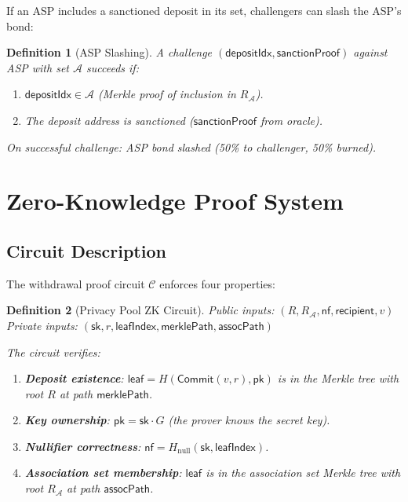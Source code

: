 \documentclass[11pt,a4paper]{article}
\newtheorem{definition}{Definition}
\begin{document}
If an ASP includes a sanctioned deposit in its set, challengers can slash the ASP's bond:

\begin{definition}[ASP Slashing]
A challenge $(\mathsf{depositIdx}, \mathsf{sanctionProof})$ against ASP with set $\mathcal{A}$ succeeds if:
\begin{enumerate}
    \item $\mathsf{depositIdx} \in \mathcal{A}$ (Merkle proof of inclusion in $R_{\mathcal{A}}$).
    \item The deposit address is sanctioned ($\mathsf{sanctionProof}$ from oracle).
\end{enumerate}
On successful challenge: ASP bond slashed (50\% to challenger, 50\% burned).
\end{definition}

\section{Zero-Knowledge Proof System}\label{sec:zk}

\subsection{Circuit Description}

The withdrawal proof circuit $\mathcal{C}$ enforces four properties:

\begin{definition}[Privacy Pool ZK Circuit]
Public inputs: $(R, R_{\mathcal{A}}, \mathsf{nf}, \mathsf{recipient}, v)$\\
Private inputs: $(\mathsf{sk}, r, \mathsf{leafIndex}, \mathsf{merklePath}, \mathsf{assocPath})$

The circuit verifies:
\begin{enumerate}
    \item \textbf{Deposit existence}: $\mathsf{leaf} = H(\mathsf{Commit}(v, r), \mathsf{pk})$ is in the Merkle tree with root $R$ at path $\mathsf{merklePath}$.
    \item \textbf{Key ownership}: $\mathsf{pk} = \mathsf{sk} \cdot G$ (the prover knows the secret key).
    \item \textbf{Nullifier correctness}: $\mathsf{nf} = H_{\text{null}}(\mathsf{sk}, \mathsf{leafIndex})$.
    \item \textbf{Association set membership}: $\mathsf{leaf}$ is in the association set Merkle tree with root $R_{\mathcal{A}}$ at path $\mathsf{assocPath}$.
\end{enumerate}
\end{definition}
\end{document}
